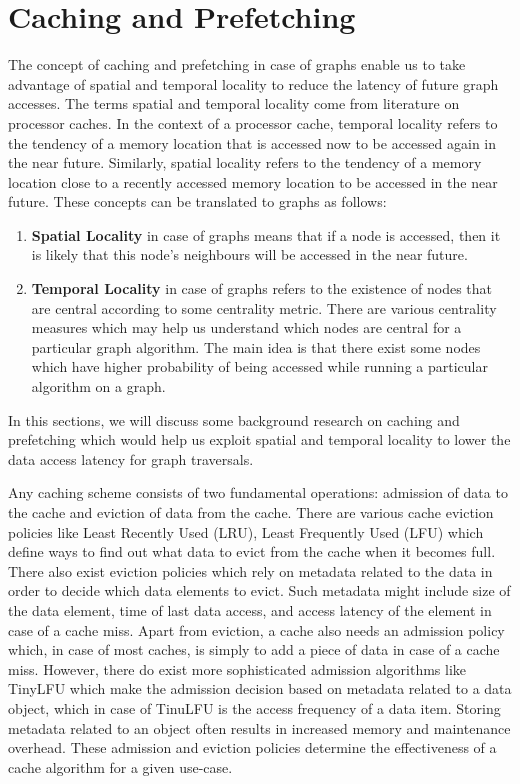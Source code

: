 \section{Caching and Prefetching}\label{sec:cachingDistSys}
The concept of caching and prefetching in case of graphs enable us to take
advantage of spatial and temporal locality to reduce the latency of future graph
accesses. The terms spatial and temporal locality come from literature on
processor caches. In the context of a processor cache, temporal locality refers
to the tendency of a memory location that is accessed now to be
accessed again in the near future. Similarly, spatial locality refers to the 
tendency of a memory location close to a recently accessed memory location to be
accessed in the near future. These concepts can be translated to graphs as
follows:
\begin{enumerate}
    \item \textbf{Spatial Locality} in case of graphs means that if a node is
        accessed, then it is likely that this node's neighbours will be accessed
        in the near future.
    \item \textbf{Temporal Locality} in case of graphs refers to the existence
        of nodes that are central according to some centrality metric. There are
        various centrality measures\cite{klein2010centrality} which may help us 
        understand which nodes are central for a particular graph algorithm. The
        main idea is that there exist some nodes which have higher probability
        of being accessed while running a particular algorithm on a graph.
\end{enumerate}
In this sections, we will discuss some background research on caching and
prefetching which would help us exploit  spatial and temporal locality to lower
the data access latency for graph traversals.

\medskip
Any caching scheme consists of two fundamental operations: admission of
data to the cache and eviction of data from the cache. There are various cache
eviction policies like Least Recently Used (LRU), Least Frequently Used (LFU)
which define ways to find out what data to evict from the cache when it becomes
full. There also exist eviction policies which rely on metadata related to the
data in order to decide which data elements to evict. Such metadata might
include size of the data element, time of last data access, and access latency
of the element in case of a cache miss. Apart from eviction, a cache also needs
an admission policy which, in case of most caches, is simply to add a piece of
data in case of a cache miss. However, there do exist more sophisticated
admission algorithms like TinyLFU\cite{einziger2017tinylfu} which make the
admission decision based on metadata related to a data object, which in case of
TinuLFU is the access frequency of a data item. Storing metadata related to an
object often results in increased memory and maintenance overhead. These
admission and eviction policies determine the effectiveness of a cache algorithm
for a given use-case.

